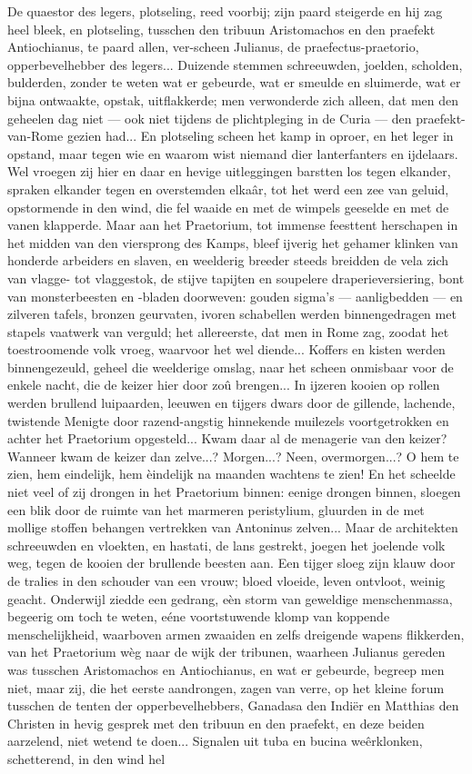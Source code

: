 \documentclass[a4paper, 12pt, oneside, dutch]{article}
\begin{document}
De quaestor des legers, plotseling, reed voorbij; zijn paard steigerde en hij zag heel bleek, en plotseling, tusschen den tribuun Aristomachos en den praefekt Antiochianus, te paard allen, ver-scheen Julianus, de praefectus-praetorio, opperbevelhebber des legers... Duizende stemmen schreeuwden, joelden, scholden, bulderden, zonder te weten wat er gebeurde, wat er smeulde en sluimerde, wat er bijna ontwaakte, opstak, uitflakkerde; men verwonderde zich alleen, dat men den geheelen dag niet --- ook niet tijdens de plichtpleging in de Curia --- den praefekt-van-Rome gezien had... En plotseling scheen het kamp in oproer, en het leger in opstand, maar tegen wie en waarom wist niemand dier lanterfanters en ijdelaars. Wel vroegen zij hier en daar en hevige uitleggingen barstten los tegen elkander, spraken elkander tegen en overstemden elkaâr, tot het werd een zee van geluid, opstormende in den wind, die fel waaide en met de wimpels geeselde en met de vanen klapperde. Maar aan het Praetorium, tot immense feesttent herschapen in het midden van den viersprong des Kamps, bleef ijverig het gehamer klinken van honderde arbeiders en slaven, en weelderig breeder steeds breidden de vela zich van vlagge- tot vlaggestok, de stijve tapijten en soupelere draperieversiering, bont van monsterbeesten en -bladen doorweven: gouden sigma's --- aanligbedden --- en zilveren tafels, bronzen geurvaten, ivoren schabellen werden binnengedragen met stapels vaatwerk van verguld; het allereerste, dat men in Rome zag, zoodat het toestroomende volk vroeg, waarvoor het wel diende... Koffers en kisten werden binnengezeuld, geheel die weelderige omslag, naar het scheen onmisbaar voor de enkele nacht, die de keizer hier door zoû brengen... In ijzeren kooien op rollen werden brullend luipaarden, leeuwen en tijgers dwars door de gillende, lachende, twistende Menigte door razend-angstig hinnekende muilezels voortgetrokken en achter het Praetorium opgesteld... Kwam daar al de menagerie van den keizer? Wanneer kwam de keizer dan zelve...? Morgen...? Neen, overmorgen...? O hem te zien, hem eindelijk, hem èindelijk na maanden wachtens te zien! En het scheelde niet veel of zij drongen in het Praetorium binnen: eenige drongen binnen, sloegen een blik door de ruimte van het marmeren peristylium, gluurden in de met mollige stoffen behangen vertrekken van Antoninus zelven... Maar de architekten schreeuwden en vloekten, en hastati, de lans gestrekt, joegen het joelende volk weg, tegen de kooien der brullende beesten aan. Een tijger sloeg zijn klauw door de tralies in den schouder van een vrouw; bloed vloeide, leven ontvloot, weinig geacht. Onderwijl ziedde een gedrang, eèn storm van geweldige menschenmassa, begeerig om toch te weten, eéne voortstuwende klomp van koppende menschelijkheid, waarboven armen zwaaiden en zelfs dreigende wapens flikkerden, van het Praetorium wèg naar de wijk der tribunen, waarheen Julianus gereden was tusschen Aristomachos en Antiochianus, en wat er gebeurde, begreep men niet, maar zij, die het eerste aandrongen, zagen van verre, op het kleine forum tusschen de tenten der opperbevelhebbers, Ganadasa den Indiër en Matthias den Christen in hevig gesprek met den tribuun en den praefekt, en deze beiden aarzelend, niet wetend te doen... Signalen uit tuba en bucina weêrklonken, schetterend, in den wind hel 
\end{document}
